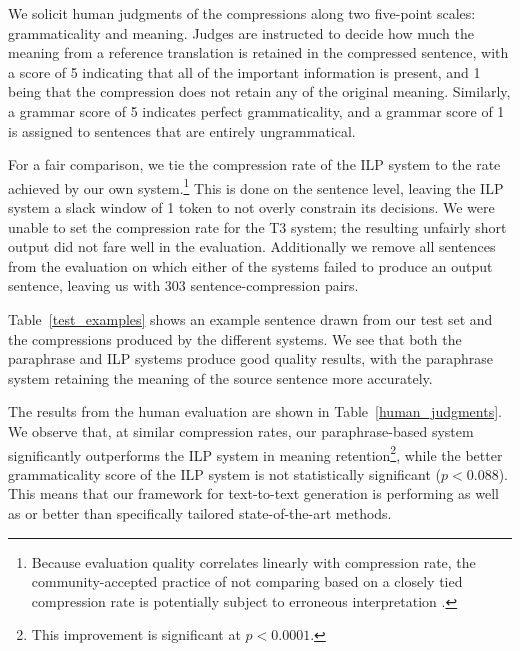 \documentclass[11pt]{article}
\begin{document}
We solicit human judgments of the compressions along two five-point
scales: grammaticality and meaning. Judges are instructed to decide
how much the meaning from a reference translation is retained in the
compressed sentence, with a score of 5 indicating that all of the
important information is present, and 1 being that the compression
does not retain any of the original meaning. Similarly, a grammar
score of 5 indicates perfect grammaticality, and a grammar score of 1
is assigned to sentences that are entirely ungrammatical.

For a fair comparison, we tie the compression rate of the ILP system
to the rate achieved by our own system.\footnote{Because 
evaluation quality correlates linearly with compression rate, 
 the community-accepted practice of not comparing based on
  a closely tied compression rate is potentially subject to erroneous
  interpretation \cite{Napoles2011}.} This is done on the sentence level, leaving the ILP
system a slack window of 1 token to not overly constrain its
decisions. We were unable to set the compression rate for the T3
system; the resulting unfairly short output did not fare well in the
evaluation.  Additionally we remove all sentences from the evaluation
on which either of the systems failed to produce an output sentence,
leaving us with 303 sentence-compression pairs.

Table~\ref{test_examples} shows an example sentence drawn from our
test set and the compressions produced by the different systems. We
see that both the paraphrase and ILP systems produce good quality
results, with the paraphrase system retaining the meaning of the
source sentence more accurately.

The results from the human evaluation are shown in
Table~\ref{human_judgments}. We observe that, at similar compression
rates, our paraphrase-based system significantly outperforms the ILP
system in meaning retention\footnote{This improvement is significant
  at $p < 0.0001$.}, while the better grammaticality score of the ILP
system is not statistically significant ($p < 0.088$). This means that
our framework for text-to-text generation is performing as well as or
better than specifically tailored state-of-the-art methods.
\end{document}
